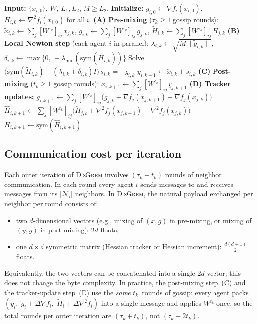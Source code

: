 \documentclass[11pt,a4paper]{article}
\begin{document}
	\begin{algorithm}[t]
\caption{\textsc{DisGrem}}
\label{alg:disgrem}
\small
\begin{algorithmic}[1]
\State \textbf{Input:} $\{x_{i,0}\}$, $W$, $L_1,L_2$, $M\ge L_2$.
\State \textbf{Initialize:} $g_{i,0}\gets\nabla f_i(x_{i,0})$, $H_{i,0}\gets\nabla^2 f_i(x_{i,0})$ for all $i$.
\State \textbf{(A) Pre-mixing} ($\tau_k\ge 1$ gossip rounds):
\Statex\qquad $\tilde x_{i,k}\gets\textstyle\sum_j [W^{\tau_k}]_{ij}\,x_{j,k}$,\quad
  $\tilde g_{i,k}\gets\textstyle\sum_j [W^{\tau_k}]_{ij}\,g_{j,k}$,\quad
  $\tilde H_{i,k}\gets\textstyle\sum_j [W^{\tau_k}]_{ij}\,H_{j,k}$
\State \textbf{(B) Local Newton step} (each agent $i$ in parallel):
\Statex\qquad $\lambda_{i,k}\gets\sqrt{M\|\tilde g_{i,k}\|}$,\quad
  $\delta_{i,k}\gets\max\{0,\,-\lambda_{\min}(\mathrm{sym}(\tilde H_{i,k}))\}$
\Statex\qquad Solve $\bigl(\mathrm{sym}(\tilde H_{i,k})+(\lambda_{i,k}+\delta_{i,k})I\bigr)\,s_{i,k}=-\tilde g_{i,k}$
\Statex\qquad $y_{i,k+1}\gets\tilde x_{i,k}+s_{i,k}$
\State \textbf{(C) Post-mixing} ($t_k\ge 1$ gossip rounds):
\Statex\qquad $x_{i,k+1}\gets\textstyle\sum_j [W^{t_k}]_{ij}\,y_{j,k+1}$
\State \textbf{(D) Tracker updates:}
\Statex\qquad $g_{i,k+1}\gets\textstyle\sum_j [W^{t_k}]_{ij}\bigl(\tilde g_{j,k}+\nabla f_j(x_{j,k+1})-\nabla f_j(x_{j,k})\bigr)$
\Statex\qquad $\widehat H_{i,k+1}\gets\textstyle\sum_j [W^{t_k}]_{ij}\bigl(\tilde H_{j,k}+\nabla^2 f_j(x_{j,k+1})-\nabla^2 f_j(x_{j,k})\bigr)$
\Statex\qquad $H_{i,k+1}\gets\mathrm{sym}(\widehat H_{i,k+1})$
\EndFor
\end{algorithmic}
\end{algorithm}
	
\subsection{Communication cost per iteration}\label{ssec:comm}

Each outer iteration of \textsc{DisGrem} involves $(\tau_k + t_k)$ rounds of neighbor communication.
In each round every agent $i$ sends messages to and receives messages from its $|\mathcal N_i|$ neighbors.
In \textsc{DisGrem}, the natural payload exchanged per neighbor per round consists of:
\begin{itemize}[leftmargin=1.2em,itemsep=1pt]
	\item two $d$-dimensional vectors (e.g., mixing of $(x,g)$ in pre-mixing, or mixing of $(y,g)$ in post-mixing): $2d$ floats,
	\item one $d\times d$ symmetric matrix (Hessian tracker or Hessian increment): $\tfrac{d(d+1)}{2}$ floats.
\end{itemize}
Equivalently, the two vectors can be concatenated into a single $2d$-vector; this does not change the byte complexity.
In practice, the post-mixing step~(C) and the tracker-update step~(D)
use the \emph{same} $t_k$~rounds of gossip: every agent packs
$(y_i,\; \tilde g_i+\Delta\nabla f_i,\; \tilde H_i+\Delta\nabla^2 f_i)$
into a single message and applies $W^{t_k}$ once, so the total rounds
per outer iteration are $(\tau_k+t_k)$, not $(\tau_k+2t_k)$.
\end{document}
